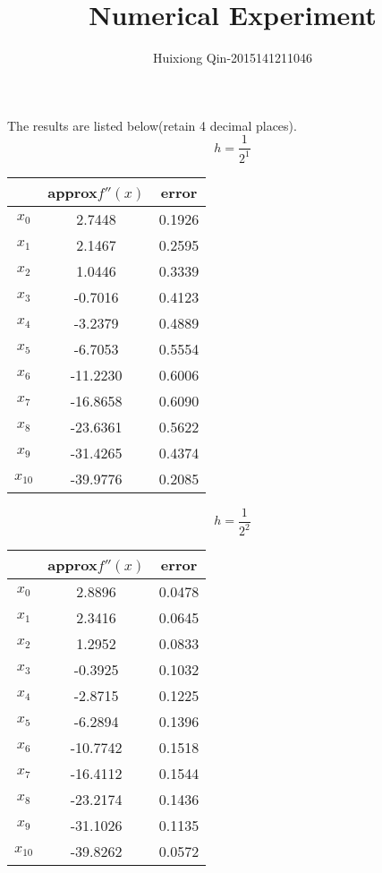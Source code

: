 \documentclass{article}
\author{Huixiong Qin-2015141211046}
\title{Numerical Experiment}
\begin{document}
\maketitle

\section{}
The results are listed below(retain 4 decimal places).\\
$$h=\frac1{2^1}$$
\begin{center}
\begin{tabular}{|c|c|c|}
  \hline
        & approx$f''(x)$ &error\\
  \hline
  $x_0$ & 2.7448  &0.1926\\
  $x_1$ & 2.1467  &0.2595\\
  $x_2$ & 1.0446 &0.3339\\
  $x_3$ & -0.7016 &0.4123\\
  $x_4$ & -3.2379 &0.4889\\
  $x_5$ & -6.7053 &0.5554\\
  $x_6$ & -11.2230 &0.6006\\
  $x_7$ & -16.8658 &0.6090\\
  $x_8$ & -23.6361 &0.5622\\
  $x_9$ & -31.4265 &0.4374\\
  $x_{10}$ & -39.9776 &0.2085\\
  \hline
\end{tabular}
\end{center}

$$h=\frac1{2^2}$$
\begin{center}
\begin{tabular}{|c|c|c|}
  \hline
        & approx$f''(x)$ &error\\
  \hline
  $x_0$ & 2.8896  &0.0478\\
  $x_1$ & 2.3416  &0.0645\\
  $x_2$ & 1.2952 &0.0833\\
  $x_3$ & -0.3925 &0.1032\\
  $x_4$ & -2.8715 &0.1225\\
  $x_5$ & -6.2894 &0.1396\\
  $x_6$ & -10.7742 &0.1518\\
  $x_7$ & -16.4112 &0.1544\\
  $x_8$ & -23.2174 &0.1436\\
  $x_9$ & -31.1026 &0.1135\\
  $x_{10}$ & -39.8262 &0.0572\\
  \hline
\end{tabular}
\end{center}
\end{document}
